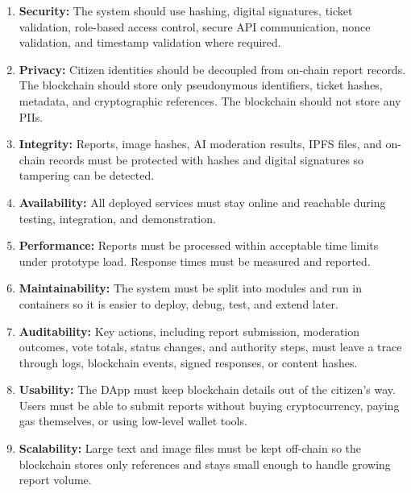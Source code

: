 \begin{enumerate}
    \item \textbf{Security:}
    The system should use hashing, digital signatures, ticket validation, role-based 
    access control, secure API communication, nonce validation, and timestamp 
    validation where required.

    \item \textbf{Privacy:}
    Citizen identities should be decoupled from on-chain report records. The blockchain should store only pseudonymous identifiers, ticket hashes, metadata, and cryptographic references. The blockchain should not store any \ac{PII}s.

    \item \textbf{Integrity:}
    Reports, image hashes, AI moderation results, \ac{IPFS} files, and on-chain records must be protected with hashes and digital signatures so tampering can be detected.

    \item \textbf{Availability:}
    All deployed services must stay online and reachable during testing, integration, and demonstration.

    \item \textbf{Performance:}
    Reports must be processed within acceptable time limits under prototype load. Response times must be measured and reported.

    \item \textbf{Maintainability:}
    The system must be split into modules and run in containers so it is easier to deploy, debug, test, and extend later.

    \item \textbf{Auditability:}
    Key actions, including report submission, moderation outcomes, vote totals, status changes, and authority steps, must leave a trace through logs, blockchain events, signed responses, or content hashes.

    \item \textbf{Usability:}
    The \ac{DApp} must keep blockchain details out of the citizen's way. Users must be able to submit reports without buying cryptocurrency, paying gas themselves, or using low-level wallet tools.

    \item \textbf{Scalability:}
    Large text and image files must be kept off-chain so the blockchain stores only references and stays small enough to handle growing report volume.
\end{enumerate}

